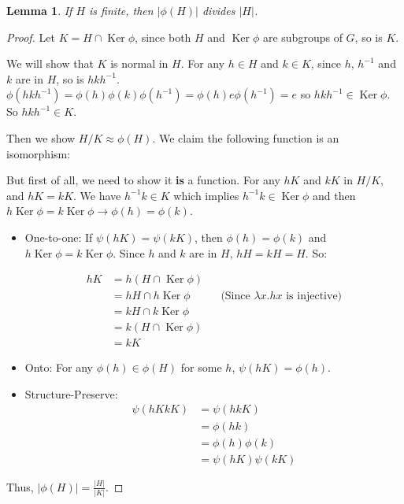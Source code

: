 \documentclass[14pt]{extarticle}
\newtheorem{lemma}{Lemma}[section]
\DeclareMathOperator{\Ker}{Ker}
\newcommand{\inv}[1]{#1^{-1}}
\newcommand{\1}{\{e\}}
\begin{document}
\begin{lemma}
  If $H$ is finite, then $|\phi(H)|$ divides $|H|$.
\end{lemma}
\begin{proof}
  Let $K = H \cap \Ker \phi$, 
  since both $H$ and $\Ker \phi$ are subgroups of $G$,
  so is $K$.

  We will show that $K$ is normal in $H$.
  For any $h \in H$ and $k \in K$, 
  since $h$, $\inv{h}$ and $k$ are in $H$, so is $hk\inv{h}$.
  $\phi(hk\inv{h}) = \phi(h)\phi(k)\phi(\inv{h}) = \phi(h)e\phi(\inv{h}) = e$ so $hk\inv{h} \in \Ker \phi$.
  So $hk\inv{h} \in K$.

  Then we show $H / K \approx \phi(H)$.
  We claim the following function is an isomorphism:

  \begin{center}
  \end{center}

  But first of all, we need to show it \textbf{is} a function.
  For any $hK$ and $kK$ in $H/K$, and $hK = kK$.
  We have $\inv{h}k \in K$ which implies $\inv{h}k \in \Ker \phi$
  and then $h \Ker \phi = k \Ker \phi \rightarrow \phi(h) = \phi(k)$.

  \begin{itemize}
    \item One-to-one: If $\psi(hK) = \psi(kK)$, 
      then $\phi(h) = \phi(k)$ and $h \Ker \phi = k \Ker \phi$.
      Since $h$ and $k$ are in $H$, $hH = kH = H$. So:
      
      \begin{align*}
        hK &= h(H \cap \Ker \phi) \\
           &= hH \cap h \Ker \phi && \text{(Since $\lambda x. hx$ is injective)} \\
           &= kH \cap k \Ker \phi \\
           &= k (H \cap \Ker \phi) \\
           &= kK
      \end{align*}
    \item Onto: For any $\phi(h) \in \phi(H)$ for some $h$, $\psi(hK) = \phi(h)$.
    \item Structure-Preserve:
      \begin{align*}
        \psi(hKkK) &= \psi(hkK) \\
          &= \phi(hk) \\
          &= \phi(h)\phi(k) \\
          &= \psi(hK)\psi(kK)
      \end{align*}
  \end{itemize}
  
  Thus, $\displaystyle |\phi(H)| = \frac{|H|}{|K|}$.
\end{proof}
\end{document}
